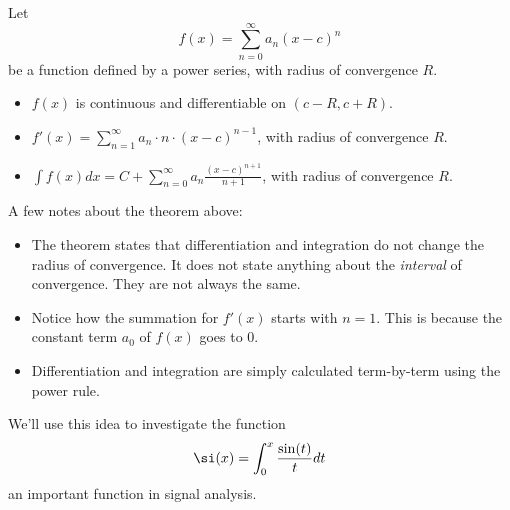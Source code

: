 \documentclass{ximera}
\begin{document}
\begin{theorem}
  Let
  \[
  f(x) = \sum_{n=0}^\infty a_n(x-c)^n
  \]
  be a function defined by a power series, with radius of convergence $R$.
  \begin{itemize}
  \item $f(x)$ is continuous and differentiable on $(c-R,c+R)$.
  \item	$f'(x) = \sum_{n=1}^\infty a_n\cdot n\cdot (x-c)^{n-1}$, with radius of convergence $R$.
  \item	$\int f(x) dx = C+\sum_{n=0}^\infty a_n\frac{(x-c)^{n+1}}{n+1}$, with radius of convergence $R$.
  \end{itemize}
\end{theorem}
A few notes about the theorem above:
\begin{itemize}
\item The theorem states that differentiation and integration do not
  change the radius of convergence. It does not state anything about
  the \textit{interval} of convergence. They are not always the same.
\item Notice how the summation for $f'(x)$ starts with $n=1$. This is
  because the constant term $a_0$ of $f(x)$ goes to $0$.
\item Differentiation and integration are simply calculated
  term-by-term using the power rule.
\end{itemize}

We'll use this idea to investigate the function 
\[
\si(x) = \int_0^x \frac{\sin(t)}{t} dt
\]
an important function in signal analysis.
\end{document}
